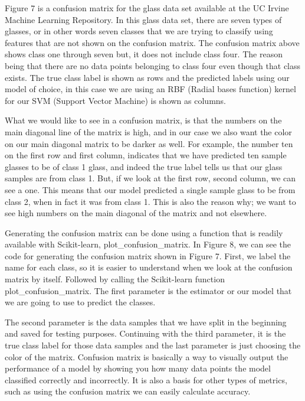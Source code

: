 \documentclass[a4paper,12pt]{report}
\begin{document}
 
Figure 7 is a confusion matrix for the glass data set available at the UC Irvine Machine Learning Repository. In this glass data set, there are seven types of glasses, or in other words seven classes that we are trying to classify using features that are not shown on the confusion matrix. The confusion matrix above shows class one through seven but, it does not include class four. The reason being that there are no data points belonging to class four even though that class exists. The true class label is shown as rows and the predicted labels using our model of choice, in this case we are using an RBF (Radial bases function) kernel for our SVM (Support Vector Machine) is shown as columns.

What we would like to see in a confusion matrix, is that the numbers on the main diagonal line of the matrix is high, and in our case we also want the color on our main diagonal matrix to be darker as well. For example, the number ten on the first row and first column, indicates that we have predicted ten sample glasses to be of class 1 glass, and indeed the true label tells us that our glass samples are from class 1. But, if we look at the first row, second column, we can see a one. This means that our model predicted a single sample glass to be from class 2, when in fact it was from class 1. This is also the reason why; we want to see high numbers on the main diagonal of the matrix and not elsewhere.


Generating the confusion matrix can be done using a function that is readily available with Scikit-learn, plot\_confusion\_matrix. In Figure 8, we can see the code for generating the confusion matrix shown in Figure 7. First, we label the name for each class, so it is easier to understand when we look at the confusion matrix by itself. Followed by calling the Scikit-learn function plot\_confusion\_matrix. The first parameter is the estimator or our model that we are going to use to predict the classes.

The second parameter is the data samples that we have split in the beginning and saved for testing purposes. Continuing with the third parameter, it is the true class label for those data samples and the last parameter is just choosing the color of the matrix. Confusion matrix is basically a way to visually output the performance of a model by showing you how many data points the model classified correctly and incorrectly. It is also a basis for other types of metrics, such as using the confusion matrix we can easily calculate accuracy.
\end{document}
